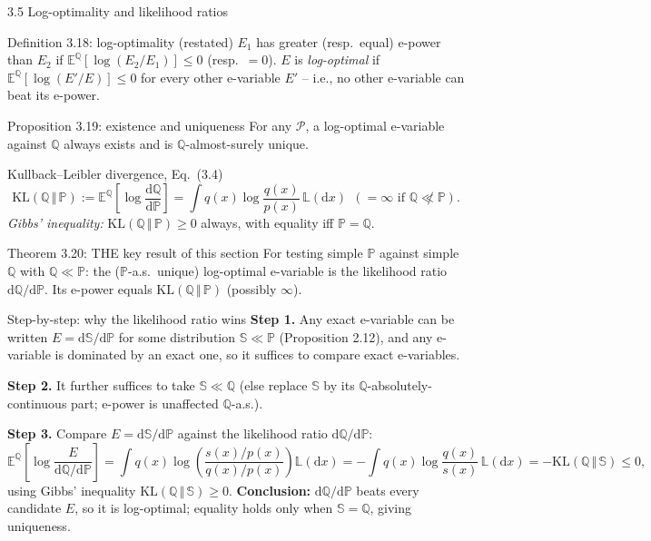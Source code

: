 \documentclass[aspectratio=169,10pt]{beamer}
\newcommand{\PP}{\mathbb{P}}
\newcommand{\QQ}{\mathbb{Q}}
\newcommand{\EE}{\mathbb{E}}
\newcommand{\Scr}{\mathbb{S}}
\newcommand{\calP}{\mathcal{P}}
\newcommand{\KL}[2]{\mathrm{KL}(#1 \,\Vert\, #2)}
\begin{document}
\begin{frame}[allowframebreaks]{3.5 Log-optimality and likelihood ratios}
  \begin{block}{Definition 3.18: log-optimality (restated)}
    $E_1$ has greater (resp.\ equal) e-power than $E_2$ if $\EE^\QQ[\log(E_2/E_1)]\le 0$ (resp.\ $=0$). $E$ is \emph{log-optimal} if $\EE^\QQ[\log(E'/E)]\le 0$ for every other e-variable $E'$ -- i.e., no other e-variable can beat its e-power.
  \end{block}

  \begin{block}{Proposition 3.19: existence and uniqueness}
    For any $\calP$, a log-optimal e-variable against $\QQ$ always exists and is $\QQ$-almost-surely unique.
  \end{block}

  \begin{block}{Kullback--Leibler divergence, Eq.~(3.4)}
    \[
      \KL{\QQ}{\PP} := \EE^\QQ\!\left[\log\frac{\mathrm{d}\QQ}{\mathrm{d}\PP}\right] = \int q(x)\log\frac{q(x)}{p(x)}\,\mathbb{L}(\mathrm{d}x) \ \ (=\infty \text{ if } \QQ\not\ll\PP).
    \]
    \emph{Gibbs' inequality:} $\KL{\QQ}{\PP}\ge 0$ always, with equality iff $\PP=\QQ$.
  \end{block}

  \begin{block}{Theorem 3.20: THE key result of this section}
    For testing simple $\PP$ against simple $\QQ$ with $\QQ\ll\PP$: the ($\PP$-a.s.\ unique) log-optimal e-variable is the likelihood ratio $\mathrm{d}\QQ/\mathrm{d}\PP$. Its e-power equals $\KL{\QQ}{\PP}$ (possibly $\infty$).
  \end{block}

  \framebreak

  \begin{block}{Step-by-step: why the likelihood ratio wins}
    \textbf{Step 1.} Any exact e-variable can be written $E=\mathrm{d}\Scr/\mathrm{d}\PP$ for some distribution $\Scr\ll\PP$ (Proposition 2.12), and any e-variable is dominated by an exact one, so it suffices to compare exact e-variables.

    \textbf{Step 2.} It further suffices to take $\Scr\ll\QQ$ (else replace $\Scr$ by its $\QQ$-absolutely-continuous part; e-power is unaffected $\QQ$-a.s.).

    \textbf{Step 3.} Compare $E=\mathrm{d}\Scr/\mathrm{d}\PP$ against the likelihood ratio $\mathrm{d}\QQ/\mathrm{d}\PP$:
    \[
      \EE^\QQ\!\left[\log\frac{E}{\mathrm{d}\QQ/\mathrm{d}\PP}\right]
      = \int q(x)\log\!\left(\frac{s(x)/p(x)}{q(x)/p(x)}\right)\mathbb{L}(\mathrm{d}x)
      = -\int q(x)\log\frac{q(x)}{s(x)}\,\mathbb{L}(\mathrm{d}x) = -\KL{\QQ}{\Scr} \le 0,
    \]
    using Gibbs' inequality $\KL{\QQ}{\Scr}\ge 0$. \textbf{Conclusion:} $\mathrm{d}\QQ/\mathrm{d}\PP$ beats every candidate $E$, so it is log-optimal; equality holds only when $\Scr=\QQ$, giving uniqueness.
  \end{block}


\end{frame}
\end{document}
